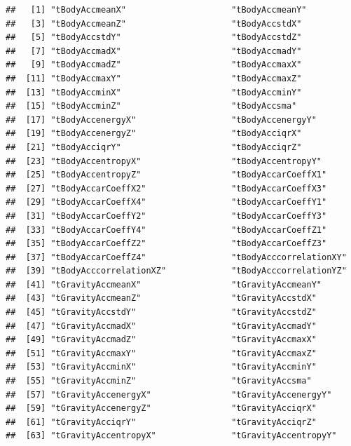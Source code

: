 \documentclass[
]{article}
\begin{document}
\begin{verbatim}
##   [1] "tBodyAccmeanX"                     "tBodyAccmeanY"                    
##   [3] "tBodyAccmeanZ"                     "tBodyAccstdX"                     
##   [5] "tBodyAccstdY"                      "tBodyAccstdZ"                     
##   [7] "tBodyAccmadX"                      "tBodyAccmadY"                     
##   [9] "tBodyAccmadZ"                      "tBodyAccmaxX"                     
##  [11] "tBodyAccmaxY"                      "tBodyAccmaxZ"                     
##  [13] "tBodyAccminX"                      "tBodyAccminY"                     
##  [15] "tBodyAccminZ"                      "tBodyAccsma"                      
##  [17] "tBodyAccenergyX"                   "tBodyAccenergyY"                  
##  [19] "tBodyAccenergyZ"                   "tBodyAcciqrX"                     
##  [21] "tBodyAcciqrY"                      "tBodyAcciqrZ"                     
##  [23] "tBodyAccentropyX"                  "tBodyAccentropyY"                 
##  [25] "tBodyAccentropyZ"                  "tBodyAccarCoeffX1"                
##  [27] "tBodyAccarCoeffX2"                 "tBodyAccarCoeffX3"                
##  [29] "tBodyAccarCoeffX4"                 "tBodyAccarCoeffY1"                
##  [31] "tBodyAccarCoeffY2"                 "tBodyAccarCoeffY3"                
##  [33] "tBodyAccarCoeffY4"                 "tBodyAccarCoeffZ1"                
##  [35] "tBodyAccarCoeffZ2"                 "tBodyAccarCoeffZ3"                
##  [37] "tBodyAccarCoeffZ4"                 "tBodyAcccorrelationXY"            
##  [39] "tBodyAcccorrelationXZ"             "tBodyAcccorrelationYZ"            
##  [41] "tGravityAccmeanX"                  "tGravityAccmeanY"                 
##  [43] "tGravityAccmeanZ"                  "tGravityAccstdX"                  
##  [45] "tGravityAccstdY"                   "tGravityAccstdZ"                  
##  [47] "tGravityAccmadX"                   "tGravityAccmadY"                  
##  [49] "tGravityAccmadZ"                   "tGravityAccmaxX"                  
##  [51] "tGravityAccmaxY"                   "tGravityAccmaxZ"                  
##  [53] "tGravityAccminX"                   "tGravityAccminY"                  
##  [55] "tGravityAccminZ"                   "tGravityAccsma"                   
##  [57] "tGravityAccenergyX"                "tGravityAccenergyY"               
##  [59] "tGravityAccenergyZ"                "tGravityAcciqrX"                  
##  [61] "tGravityAcciqrY"                   "tGravityAcciqrZ"                  
##  [63] "tGravityAccentropyX"               "tGravityAccentropyY"              

\end{verbatim}
\end{document}
